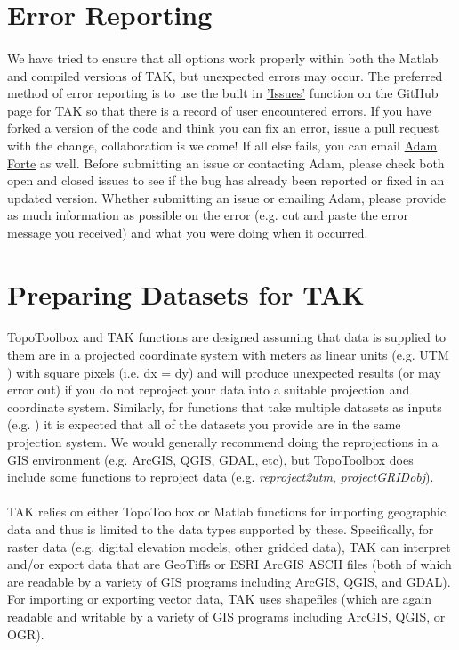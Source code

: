 \section{Error Reporting}
\paragraph{}We have tried to ensure that all options work properly within both the Matlab and compiled versions of TAK, but unexpected errors may occur. The preferred method of error reporting is to use the built in \href{https://github.com/amforte/Topographic-Analysis-Kit/issues}{'Issues'} function on the GitHub page for TAK so that there is a record of user encountered errors. If you have forked a version of the code and think you can fix an error, issue a pull request with the change, collaboration is welcome! If all else fails, you can email \href{mailto:aforte8@lsu.edu}{Adam Forte} as well. Before submitting an issue or contacting Adam, please check both open and closed issues to see if the bug has already been reported or fixed in an updated version. Whether submitting an issue or emailing Adam, please provide as much information as possible on the error (e.g. cut and paste the error message you received) and what you were doing when it occurred.

\section{Preparing Datasets for TAK} \label{sec:exmpl}
\paragraph{}TopoToolbox and TAK functions are designed assuming that data is supplied to them are in a projected coordinate system with meters as linear units (e.g. UTM ) with square pixels (i.e. dx = dy) and will produce unexpected results (or may error out) if you do not reproject your data into a suitable projection and coordinate system. Similarly, for functions that take multiple datasets as inputs (e.g. ) it is expected that all of the datasets you provide are in the same projection system. We would generally recommend doing the reprojections in a GIS environment (e.g. ArcGIS, QGIS, GDAL, etc), but TopoToolbox does include some functions to reproject data (e.g. \textit{reproject2utm}, \textit{projectGRIDobj}).

\paragraph{}TAK relies on either TopoToolbox or Matlab functions for importing geographic data and thus is limited to the data types supported by these. Specifically, for raster data (e.g. digital elevation models, other gridded data), TAK can interpret and/or export data that are GeoTiffs or ESRI ArcGIS ASCII files (both of which are readable by a variety of GIS programs including ArcGIS, QGIS, and GDAL). For importing or exporting vector data, TAK uses shapefiles (which are again readable and writable by a variety of GIS programs including ArcGIS, QGIS, or OGR).

